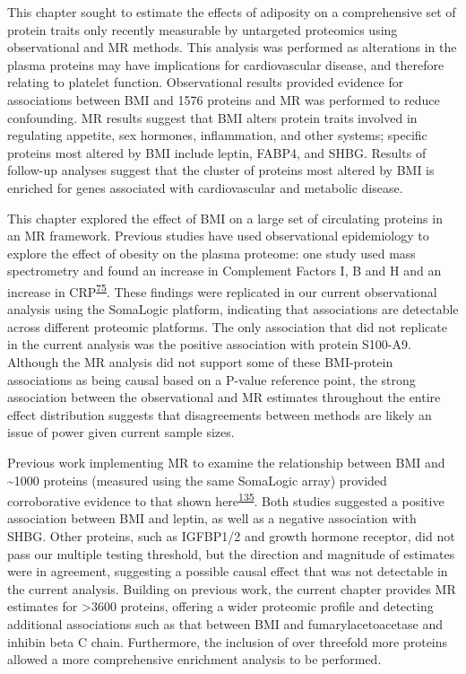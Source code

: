 \documentclass[11pt,twoside]{bristolthesis}
\begin{document}
This chapter sought to estimate the effects of adiposity on a comprehensive set of protein traits only recently measurable by untargeted proteomics using observational and MR methods. This analysis was performed as alterations in the plasma proteins may have implications for cardiovascular disease, and therefore relating to platelet function. Observational results provided evidence for associations between BMI and 1576 proteins and MR was performed to reduce confounding. MR results suggest that BMI alters protein traits involved in regulating appetite, sex hormones, inflammation, and other systems; specific proteins most altered by BMI include leptin, FABP4, and SHBG. Results of follow-up analyses suggest that the cluster of proteins most altered by BMI is enriched for genes associated with cardiovascular and metabolic disease.

This chapter explored the effect of BMI on a large set of circulating proteins in an MR framework. Previous studies have used observational epidemiology to explore the effect of obesity on the plasma proteome: one study used mass spectrometry and found an increase in Complement Factors I, B and H and an increase in CRP\textsuperscript{\protect\hyperlink{ref-Cominetti2018}{75}}. These findings were replicated in our current observational analysis using the SomaLogic platform, indicating that associations are detectable across different proteomic platforms. The only association that did not replicate in the current analysis was the positive association with protein S100-A9. Although the MR analysis did not support some of these BMI-protein associations as being causal based on a P-value reference point, the strong association between the observational and MR estimates throughout the entire effect distribution suggests that disagreements between methods are likely an issue of power given current sample sizes.

Previous work implementing MR to examine the relationship between BMI and \textasciitilde1000 proteins (measured using the same SomaLogic array) provided corroborative evidence to that shown here\textsuperscript{\protect\hyperlink{ref-Zaghlool2021}{135}}. Both studies suggested a positive association between BMI and leptin, as well as a negative association with SHBG. Other proteins, such as IGFBP1/2 and growth hormone receptor, did not pass our multiple testing threshold, but the direction and magnitude of estimates were in agreement, suggesting a possible causal effect that was not detectable in the current analysis. Building on previous work, the current chapter provides MR estimates for \textgreater3600 proteins, offering a wider proteomic profile and detecting additional associations such as that between BMI and fumarylacetoacetase and inhibin beta C chain. Furthermore, the inclusion of over threefold more proteins allowed a more comprehensive enrichment analysis to be performed.
\end{document}
